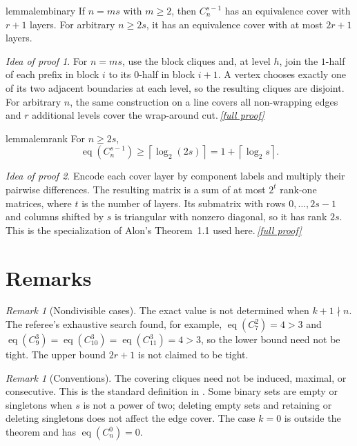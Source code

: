 \documentclass[11pt,a4paper]{article}
\theoremstyle{plain}
\theoremstyle{definition}
\theoremstyle{remark}
\newtheorem{remark}[theorem]{Remark}
\newtheorem*{proofidea}{Idea of proof}
\newcommand{\fullproofref}[1]{\,\hyperref[#1]{\textit{[full proof]}}}
\newcommand{\eqc}{\operatorname{eq}}
\newcommand{\ceil}[1]{\left\lceil #1\right\rceil}
\begin{document}
\begin{restatable}{lemma}{lembinary}\label{lem:binary}
If $n=ms$ with $m\ge2$, then $C_n^{s-1}$ has an equivalence cover with $r+1$ layers.
For arbitrary $n\ge2s$, it has an equivalence cover with at most $2r+1$ layers.
\end{restatable}
\begin{proofidea}
For $n=ms$, use the block cliques and, at level $h$, join the $1$-half of each prefix
in block $i$ to its $0$-half in block $i+1$.  A vertex chooses exactly one of its two
adjacent boundaries at each level, so the resulting cliques are disjoint.  For arbitrary
$n$, the same construction on a line covers all non-wrapping edges and $r$ additional
levels cover the wrap-around cut.\fullproofref{pf:binary}
\end{proofidea}

\begin{restatable}{lemma}{lemrank}\label{lem:rank}
For $n\ge2s$,
\[
 \eqc(C_n^{s-1})\ge\ceil{\log_2(2s)}=1+\ceil{\log_2s}.
\]
\end{restatable}
\begin{proofidea}
Encode each cover layer by component labels and multiply their pairwise differences.
The resulting matrix is a sum of at most $2^t$ rank-one matrices, where $t$ is the
number of layers.  Its submatrix with rows $0,\ldots,2s-1$ and columns shifted by $s$
is triangular with nonzero diagonal, so it has rank $2s$.  This is the specialization
of Alon's Theorem~1.1 used here.\fullproofref{pf:rank}
\end{proofidea}

\section{Remarks}

\begin{remark}[Nondivisible cases]
The exact value is not determined when $k+1\nmid n$.  The referee's exhaustive search
found, for example, $\eqc(C_7^2)=4>3$ and
$\eqc(C_9^3)=\eqc(C_{10}^3)=\eqc(C_{11}^3)=4>3$, so the lower bound need not be tight.
The upper bound $2r+1$ is not claimed to be tight.
\end{remark}

\begin{remark}[Conventions]
The covering cliques need not be induced, maximal, or consecutive.  This is the
standard definition in \cite{Alon86,EGK10,OPG}.  Some binary sets are empty or
singletons when $s$ is not a power of two; deleting empty sets and retaining or deleting
singletons does not affect the edge cover.  The case $k=0$ is outside the theorem and
has $\eqc(C_n^0)=0$.
\end{remark}
\end{document}
